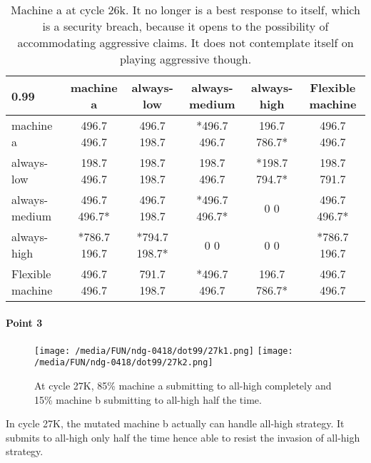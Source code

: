 \documentclass[12.5pt]{report}
\begin{document}
\begin{table}[h!]
\center
\begin{tabular}{l|ccccc}
\textbf{0.99}& machine a & always-low & always-medium & always-high & Flexible machine\\
\hline
machine a & 496.7 496.7  &  496.7 198.7  & *496.7 496.7  &  196.7 786.7* &  496.7 496.7  \\
always-low  &  198.7 496.7  &  198.7 198.7  &  198.7 496.7 &  *198.7 794.7* &  198.7 791.7  \\
always-medium   & 496.7 496.7*  & 496.7 198.7 &  *496.7 496.7*  &     0 0   &     496.7 496.7* \\
always-high   &*786.7 196.7  & *794.7 198.7*   &    0 0     &       0 0   &    *786.7 196.7  \\
Flexible machine   & 496.7 496.7 &   791.7 198.7 &  *496.7 496.7  &  196.7 786.7*  & 496.7 496.7 \\
\end{tabular}
\caption{Machine a at cycle 26k. It no longer is a best response to itself, which is a security breach, because it opens to the possibility of accommodating aggressive claims. It does not contemplate itself on playing aggressive though.}
\end{table}


\paragraph{Point 3}

\begin{figure}[h!]
\center
\texttt{[image: /media/FUN/ndg-0418/dot99/27k1.png]}
\texttt{[image: /media/FUN/ndg-0418/dot99/27k2.png]}
\caption{At cycle 27K, 85\% machine a submitting to all-high completely and 15\% machine b submitting to all-high half the time.}
\end{figure}

In cycle 27K, the mutated machine b actually can handle all-high strategy. It submits to all-high only half the time hence able to resist the invasion of all-high strategy.
\end{document}
